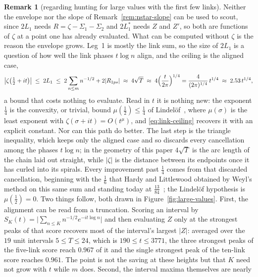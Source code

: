 \documentclass[11pt]{article}
\theoremstyle{definition}
\newtheorem{remark}[theorem]{Remark}
\begin{document}
\begin{remark}[regarding hunting for large values with the first few links]
\label{rem:large-values}
Neither the envelope nor the slope of Remark~\ref{rem:nstar-slope} can be used to
scout, since $2L_1$ needs $R=\zeta-\Sigma_1-\Sigma_2$ and $2L_1^{\ast}$ needs $Z$
and $Z'$, so both are functions of $\zeta$ at a point one has already evaluated.
What can be computed without $\zeta$ is the reason the envelope grows. Leg~1 is
mostly the link sum, so
the size of $2L_1$ is a question of how well the link phases $t\log n$ align, and
the ceiling is the aligned case,
\begin{equation}\label{eq:link-ceiling}
\bigl|\zeta\bigl(\tfrac12+it\bigr)\bigr|\;\leq\;2L_1\;\leq\;
2\sum_{n\leq m}n^{-1/2}+2|R_{1ps}|\;\approx\;4\sqrt{T}
\;\approx\;4\Bigl(\frac{t}{2\pi}\Bigr)^{1/4}
=\frac{4}{(2\pi)^{1/4}}\,t^{1/4}\;\approx\;2.53\,t^{1/4},
\end{equation}
a bound that costs nothing to evaluate. Read in $t$ it is nothing new: the
exponent $\tfrac14$ is the convexity, or trivial, bound $\mu(\tfrac12)\le\tfrac14$
of Lindel\"of~\cite{Lindelof1908}, where $\mu(\sigma)$ is the least exponent with
$\zeta(\sigma+it)=O(t^{\mu})$, and \eqref{eq:link-ceiling} recovers it with an
explicit constant. Nor can this path do better. The last step is the triangle
inequality, which keeps only the aligned case and so discards every cancellation
among the phases $t\log n$; in the geometry of this paper $4\sqrt T$ is the arc
length of the chain laid out straight, while $|\zeta|$ is the distance between its
endpoints once it has curled into its spirals. Every improvement past $\tfrac14$
comes from that discarded cancellation, beginning with the $\tfrac16$ that Hardy
and Littlewood obtained by Weyl's method on this same sum and standing today at
$\tfrac{13}{84}$~\cite{Bourgain2017}; the Lindel\"of hypothesis is
$\mu(\tfrac12)=0$. Two things follow, both drawn in
Figure~\ref{fig:large-values}. First, the alignment can be read from a
truncation. Scoring an interval by
$S_K(t)=\bigl|\sum_{n\leq K}n^{-1/2}e^{-it\log n}\bigr|$ and then evaluating $Z$
only at the strongest peaks of that score recovers most of the interval's largest
$|Z|$: averaged over the $19$ unit intervals $5\leq T\leq24$, which is
$190\leq t\leq3771$, the three strongest peaks of the five-link score reach
$0.967$ of it and the single strongest peak of the ten-link score reaches
$0.961$. The point is not the saving at these heights but that $K$ need not grow
with $t$ while $m$ does. Second, the interval maxima themselves are nearly

\end{remark}
\end{document}
